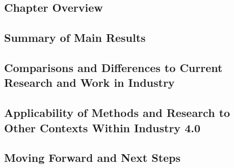 \subsection{Chapter Overview}

\subsection{Summary of Main Results}

\subsection{Comparisons and Differences to Current Research and Work in Industry}

\subsection{Applicability of Methods and Research to Other Contexts Within Industry 4.0}

\subsection{Moving Forward and Next Steps}